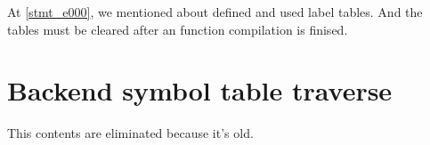 At \ref{stmt_e000}, we mentioned about defined and used label tables.
And the tables must be cleared after an function compilation is finised.

\section{Backend symbol table traverse}
\label{speedback_e}
This contents are eliminated because it's old.

